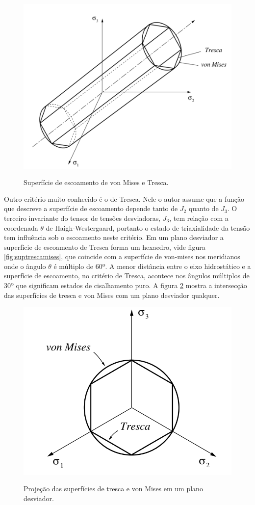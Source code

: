 \begin{figure}[H]
    \centering
    \caption{Superfície de escoamento de  von Mises e Tresca.}
    \includegraphics[width=0.7\linewidth]{images/Sup_trescaemises.png} %
    \label{fig:suptrescaemises}
\end{figure}

Outro critério muito conhecido é o de Tresca. Nele o autor assume que a função que descreve a superfície de escoamento depende tanto de $ J_2 $ quanto de $ J_3 $. O terceiro invariante do tensor de tensões desviadoras, $ J_3 $, tem relação com a coordenada $ \theta $ de Haigh-Westergaard, portanto o estado de triaxialidade da tensão tem influência sob o escoamento neste critério. Em um plano desviador a superfície de escoamento de Tresca forma um hexaedro, vide figura \ref{fig:suptrescamises}, que coincide com a superfície de von-mises nos meridianos onde o ângulo $ \theta $ é múltiplo de $ 60º $. A menor distância entre o eixo hidrostático e a superfície de escoamento, no critério de Tresca, acontece nos ângulos múltiplos de $ 30º $ que significam estados de cisalhamento puro. A figura \ref{fig:trescamises} mostra a intersecção das superfícies de tresca e von Mises com um plano desviador qualquer.


\begin{figure}[H]
    \centering
    \caption{Projeção das superfícies de tresca e von Mises em um plano desviador.}
    \includegraphics[width=0.7\linewidth]{images/trescaemises.png} %
    \label{fig:trescamises}
\end{figure}


